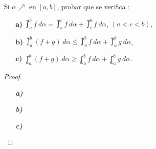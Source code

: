 \setcounter{section}{7}
\setcounter{exercise}{10}

\begin{exercise}

Si $\alpha \nearrow$ en $\left[a,b\right]$, probar que se verifica :

\begin{itemize}
  \item[\textbf{a)}]$\upint_a^b f\ d\alpha = \upint_a^c f\ d\alpha + \upint_c^b f\ d\alpha$, $\left(a<c<b\right)$,
  \item[\textbf{b)}]$\upint_a^b \left(f+g\right)\ d\alpha \leq \upint_a^b f\ d\alpha + \upint_a^b g\ d\alpha$,
  \item[\textbf{c)}]$\lowint_a^b \left(f+g\right)\ d\alpha \geq \lowint_a^b f\ d\alpha + \lowint_a^b g\ d\alpha$.
\end{itemize}

\end{exercise}

\begin{proof}

\begin{itemize}
  \item[\textbf{\textit{a)}}]
  \item[\textbf{\textit{b)}}]
  \item[\textbf{\textit{c)}}]
\end{itemize}

\end{proof}

